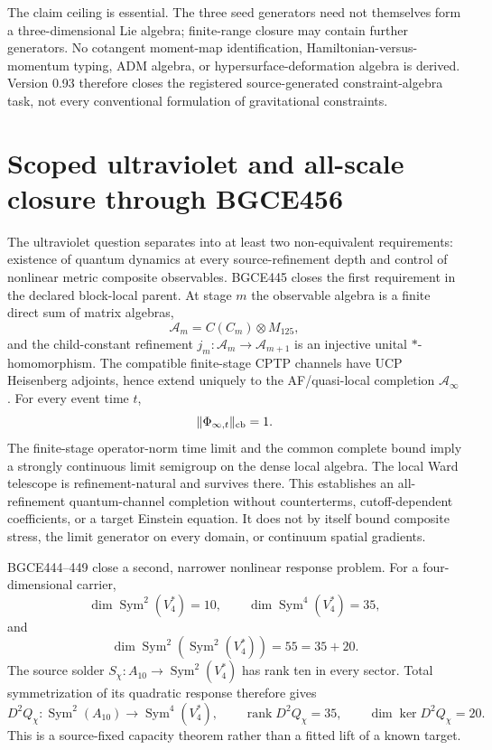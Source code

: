 \documentclass[11pt]{article}
\theoremstyle{definition}
\theoremstyle{remark}
\newcommand{\Sym}{\operatorname{Sym}}
\begin{document}
The claim ceiling is essential. The three seed generators need not themselves form a three-dimensional Lie algebra; finite-range closure may contain further generators. No cotangent moment-map identification, Hamiltonian-versus-momentum typing, ADM algebra, or hypersurface-deformation algebra is derived. Version 0.93 therefore closes the registered source-generated constraint-algebra task, not every conventional formulation of gravitational constraints.

\section{Scoped ultraviolet and all-scale closure through BGCE456}\label{sec:uv09}

The ultraviolet question separates into at least two non-equivalent requirements: existence of quantum dynamics at every source-refinement depth and control of nonlinear metric composite observables. BGCE445 closes the first requirement in the declared block-local parent. At stage $m$ the observable algebra is a finite direct sum of matrix algebras,
\begin{equation}
 \mathcal A_m=C(C_m)\otimes M_{125},
\end{equation}
and the child-constant refinement $j_m:\mathcal A_m\to\mathcal A_{m+1}$ is an injective unital $*$-homomorphism. The compatible finite-stage CPTP channels have UCP Heisenberg adjoints, hence extend uniquely to the AF/quasi-local completion $\mathcal A_\infty$. For every event time $t$,
\begin{equation}
 \lVert\Phi_{\infty,t}\rVert_{\rm cb}=1.
\end{equation}
The finite-stage operator-norm time limit and the common complete bound imply a strongly continuous limit semigroup on the dense local algebra. The local Ward telescope is refinement-natural and survives there. This establishes an all-refinement quantum-channel completion without counterterms, cutoff-dependent coefficients, or a target Einstein equation. It does not by itself bound composite stress, the limit generator on every domain, or continuum spatial gradients.

BGCE444--449 close a second, narrower nonlinear response problem. For a four-dimensional carrier,
\begin{equation}
 \dim\Sym^2(V_4^*)=10,
 \qquad
 \dim\Sym^4(V_4^*)=35,
\end{equation}
and
\begin{equation}
 \dim\Sym^2\!\left(\Sym^2(V_4^*)\right)=55=35+20.
\end{equation}
The source solder $S_\chi:A_{10}\to\Sym^2(V_4^*)$ has rank ten in every sector. Total symmetrization of its quadratic response therefore gives
\begin{equation}
 D^2Q_\chi:\Sym^2(A_{10})\longrightarrow\Sym^4(V_4^*),
 \qquad \operatorname{rank}D^2Q_\chi=35,
 \qquad \dim\ker D^2Q_\chi=20.
\end{equation}
This is a source-fixed capacity theorem rather than a fitted lift of a known target.
\end{document}
